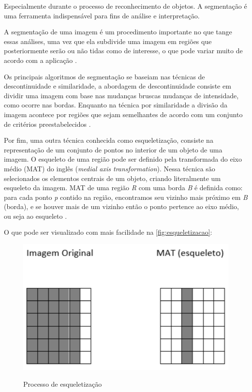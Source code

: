 Especialmente durante o processo de reconhecimento de objetos. 
A segmentação é uma ferramenta indispensável para fins de análise e interpretação.

A segmentação de uma imagem é um procedimento importante no que tange
essas análises, uma vez que ela subdivide uma imagem em regiões que
posteriormente serão ou não tidas como de interesse, o que pode variar muito de
acordo com a aplicação \cite{gonzalez2010}.

Os principais algoritmos de segmentação se baseiam nas técnicas de
descontinuidade e similaridade, a abordagem de descontinuidade consiste em dividir
uma imagem com base nas mudanças bruscas mudanças de intensidade, como
ocorre nas bordas. Enquanto na técnica por similaridade a divisão da imagem
acontece por regiões que sejam semelhantes de acordo com um conjunto de critérios
preestabelecidos \cite{gonzalez2010}.

Por fim, uma outra técnica conhecida como esqueletização, 
consiste na representação de um conjunto de pontos no interior de um 
objeto de uma imagem. O esqueleto de uma região pode
ser definido pela transformada do eixo médio (MAT) do inglês (\textit{medial axis
transformation}). Nessa técnica são selecionados os elementos centrais de um objeto,
criando literalmente um esqueleto da imagem. MAT de uma região \textit{R} com uma borda
\textit{B} é definida como: para cada ponto \textit{p} contido na região, encontramos seu vizinho
mais próximo em \textit{B} (borda), e se houver mais de um vizinho então o ponto pertence
ao eixo médio, ou seja ao esqueleto \cite{gonzalez2010}.

O que pode ser visualizado com mais facilidade na \autoref{fig:esqueletizacao}:

\begin{figure}[h!]
    \centering
    \caption{Processo de esqueletização}
    \includegraphics[scale=0.25]{figuras/esqueletizacao.png} 
    \fonte{}%
    \label{fig:esqueletizacao}
    \centering
\end{figure}

